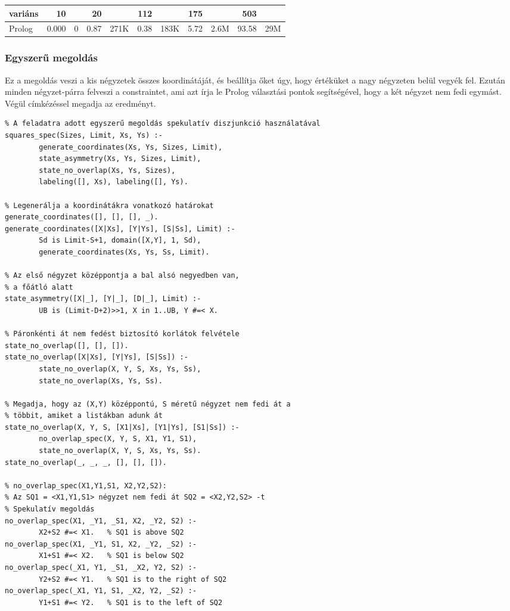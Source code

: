 \begin{center}
\begin{tabular}{|l|rr|rr|rr|rr|rr|}
\hline
variáns   & 10     &      &  20   &      & 112    &      & 175   &    & 503  &\\
\hline
Prolog          &  0.000 &     0&  0.87& 271K &  0.38 &  183K & 5.72 & 2.6M
&93.58 & 29M \\
\hline
\end{tabular}
\end{center}

\subsubsection{Egyszerű \clpfd megoldás}

Ez a megoldás veszi a kis négyzetek összes koordinátáját, és beállítja
őket úgy, hogy értéküket a nagy négyzeten belül vegyék fel. Ezután
minden négyzet-párra felveszi a  constraintet,
ami azt írja le Prolog választási pontok segítségével, hogy a két
négyzet nem fedi egymást. Végül címkézéssel megadja az eredményt.

\begin{verbatim}
% A feladatra adott egyszerű megoldás spekulatív diszjunkció használatával
squares_spec(Sizes, Limit, Xs, Ys) :-
        generate_coordinates(Xs, Ys, Sizes, Limit),
        state_asymmetry(Xs, Ys, Sizes, Limit),
        state_no_overlap(Xs, Ys, Sizes),
        labeling([], Xs), labeling([], Ys).

% Legenerálja a koordinátákra vonatkozó határokat
generate_coordinates([], [], [], _).
generate_coordinates([X|Xs], [Y|Ys], [S|Ss], Limit) :-
        Sd is Limit-S+1, domain([X,Y], 1, Sd),
        generate_coordinates(Xs, Ys, Ss, Limit).

% Az első négyzet középpontja a bal alsó negyedben van,
% a főátló alatt
state_asymmetry([X|_], [Y|_], [D|_], Limit) :-
        UB is (Limit-D+2)>>1, X in 1..UB, Y #=< X.

% Páronkénti át nem fedést biztosító korlátok felvétele
state_no_overlap([], [], []).
state_no_overlap([X|Xs], [Y|Ys], [S|Ss]) :-
        state_no_overlap(X, Y, S, Xs, Ys, Ss),
        state_no_overlap(Xs, Ys, Ss).

% Megadja, hogy az (X,Y) középpontú, S méretű négyzet nem fedi át a
% többit, amiket a listákban adunk át
state_no_overlap(X, Y, S, [X1|Xs], [Y1|Ys], [S1|Ss]) :-
        no_overlap_spec(X, Y, S, X1, Y1, S1),
        state_no_overlap(X, Y, S, Xs, Ys, Ss).
state_no_overlap(_, _, _, [], [], []).

% no_overlap_spec(X1,Y1,S1, X2,Y2,S2): 
% Az SQ1 = <X1,Y1,S1> négyzet nem fedi át SQ2 = <X2,Y2,S2> -t
% Spekulatív megoldás
no_overlap_spec(X1, _Y1, _S1, X2, _Y2, S2) :-   
        X2+S2 #=< X1.   % SQ1 is above SQ2
no_overlap_spec(X1, _Y1, S1, X2, _Y2, _S2) :- 
        X1+S1 #=< X2.   % SQ1 is below SQ2
no_overlap_spec(_X1, Y1, _S1, _X2, Y2, S2) :-
        Y2+S2 #=< Y1.   % SQ1 is to the right of SQ2
no_overlap_spec(_X1, Y1, S1, _X2, Y2, _S2) :-   
        Y1+S1 #=< Y2.   % SQ1 is to the left of SQ2
\end{verbatim}

